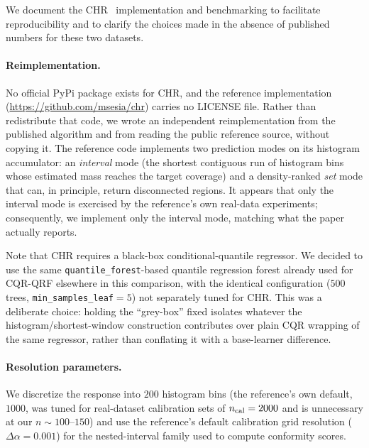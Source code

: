 \documentclass[11pt]{article}
\begin{document}
We document the CHR~\citep{SesiaRomano2021} implementation and benchmarking %
to facilitate reproducibility and to clarify the choices made in the absence of published
numbers for these two datasets.

\paragraph{Reimplementation.}
No official PyPi package exists for CHR, and the reference implementation
(\url{https://github.com/msesia/chr}) carries no LICENSE file. Rather than
redistribute that code, we wrote an independent reimplementation from the published
algorithm and from reading the public reference source, without copying it.
The reference code implements two prediction modes on its histogram accumulator: an
\emph{interval} mode (the shortest contiguous run of histogram bins whose estimated
mass reaches the target coverage) and a density-ranked \emph{set} mode that can, in
principle, return disconnected regions. It appears that only the interval mode is exercised by the
reference's own real-data experiments;  consequently, we implement only the interval mode, matching
what the paper actually reports.

Note that CHR requires a black-box conditional-quantile regressor. We decided to use the same
\texttt{quantile\_forest}-based quantile regression forest already used for CQR-QRF
elsewhere in this comparison, with the identical configuration
($500$ trees, \texttt{min\_samples\_leaf}$=5$) not separately tuned for CHR. This
was a deliberate choice: holding the ``grey-box'' fixed isolates whatever the
histogram/shortest-window construction contributes over plain CQR wrapping of the
same regressor, rather than conflating it with a base-learner difference.

\paragraph{Resolution parameters.}
We discretize the response into $200$ histogram bins (the reference's own default,
$1000$, was tuned for real-dataset calibration sets of $n_{\rm cal}=2000$ and is
unnecessary at our $n\sim 100$--$150$) and use the reference's default calibration
grid resolution ($\Delta\alpha = 0.001$) for the nested-interval family used to
compute conformity scores. 
\end{document}
